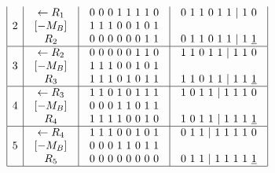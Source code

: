 $$\begin{array}{c}
\begin{array}{|c|c|c|c|}
2 & \begin{array}{c}\leftarrow R_1 \\  \left[-M_B\right]_{\textup{}} \\ R_2\end{array} & \begin{array}{c}0\ 0\ 0\ 1\ 1\ 1\ 1\ 0 \\ 1\ 1\ 1\ 0\ 0\ 1\ 0\ 1 \\ 0\ 0\ 0\ 0\ 0\ 0\ 1\ 1\end{array} & \begin{array}{c}0\ 1\ 1\ 0\ 1\ 1\ |\ 1\ 0 \\  \\ 0\ 1\ 1\ 0\ 1\ 1\ |\ 1\ \underline{1}\end{array} \\ \hline 
3 & \begin{array}{c}\leftarrow R_2 \\  \left[-M_B\right]_{\textup{}} \\ R_3\end{array} & \begin{array}{c}0\ 0\ 0\ 0\ 0\ 1\ 1\ 0 \\ 1\ 1\ 1\ 0\ 0\ 1\ 0\ 1 \\ 1\ 1\ 1\ 0\ 1\ 0\ 1\ 1\end{array} & \begin{array}{c}1\ 1\ 0\ 1\ 1\ |\ 1\ 1\ 0 \\  \\ 1\ 1\ 0\ 1\ 1\ |\ 1\ 1\ \underline{1}\end{array} \\ \hline 
4 & \begin{array}{c}\leftarrow R_3 \\  \left[-M_B\right]_{\textup{}} \\ R_4\end{array} & \begin{array}{c}1\ 1\ 0\ 1\ 0\ 1\ 1\ 1 \\ 0\ 0\ 0\ 1\ 1\ 0\ 1\ 1 \\ 1\ 1\ 1\ 1\ 0\ 0\ 1\ 0\end{array} & \begin{array}{c}1\ 0\ 1\ 1\ |\ 1\ 1\ 1\ 0 \\  \\ 1\ 0\ 1\ 1\ |\ 1\ 1\ 1\ \underline{1}\end{array} \\ \hline 
5 & \begin{array}{c}\leftarrow R_4 \\  \left[-M_B\right]_{\textup{}} \\ R_5\end{array} & \begin{array}{c}1\ 1\ 1\ 0\ 0\ 1\ 0\ 1 \\ 0\ 0\ 0\ 1\ 1\ 0\ 1\ 1 \\ 0\ 0\ 0\ 0\ 0\ 0\ 0\ 0\end{array} & \begin{array}{c}0\ 1\ 1\ |\ 1\ 1\ 1\ 1\ 0 \\  \\ 0\ 1\ 1\ |\ 1\ 1\ 1\ 1\ \underline{1}\end{array} \\ \hline 

\end{array}
\end{array}$$
